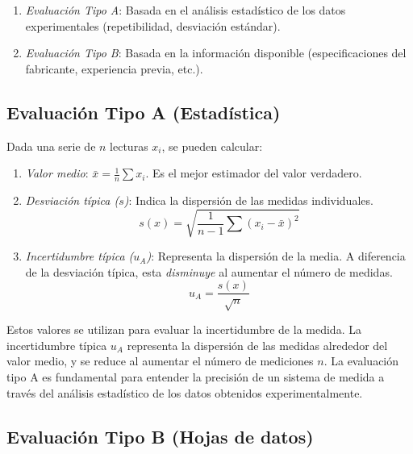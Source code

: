 \begin{enumerate}
    \item \emph{Evaluación Tipo A}: Basada en el análisis estadístico de los datos experimentales (repetibilidad, desviación estándar).
    \item \emph{Evaluación Tipo B}: Basada en la información disponible (especificaciones del fabricante, experiencia previa, etc.).
\end{enumerate}

\subsection{Evaluación Tipo A (Estadística)}\label{sec:eval_tipoA}

Dada una serie de $n$ lecturas $x_i$, se pueden calcular:

\begin{enumerate}
  \item \emph{Valor medio}: $\bar{x} = \frac{1}{n} \sum x_i$. Es el mejor estimador del valor verdadero.
  \item \emph{Desviación típica ($s$)}: Indica la dispersión de las medidas individuales.
    \[ s(x) = \sqrt{\frac{1}{n-1} \sum{(x_i - \bar{x})}^2} \]
  \item \emph{Incertidumbre típica ($u_A$)}: Representa la dispersión de la media. A diferencia de la desviación típica, esta \emph{disminuye} al aumentar el número de medidas.
    \[ u_A = \frac{s(x)}{\sqrt{n}} \]
\end{enumerate}

Estos valores se utilizan para evaluar la incertidumbre de la medida. La incertidumbre típica $u_A$ representa la dispersión de las medidas alrededor del valor medio, y se reduce al aumentar el número de mediciones $n$. La evaluación tipo A es fundamental para entender la precisión de un sistema de medida a través del análisis estadístico de los datos obtenidos experimentalmente. 

\subsection{Evaluación Tipo B (Hojas de datos)}\label{sec:eval_tipoB}

